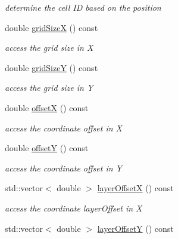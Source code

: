 \begin{DoxyCompactItemize}
\begin{DoxyCompactList}\small\item\em determine the cell ID based on the position \item\end{DoxyCompactList}\item 
double \hyperlink{class_d_d4hep_1_1_d_d_segmentation_1_1_tiled_layer_grid_x_y_a87648f3136523b1d32b0c3a02e85fa28}{gridSizeX} () const 
\begin{DoxyCompactList}\small\item\em access the grid size in X \item\end{DoxyCompactList}\item 
double \hyperlink{class_d_d4hep_1_1_d_d_segmentation_1_1_tiled_layer_grid_x_y_a1e3d5ba29ff7da392441b974bc6c2c44}{gridSizeY} () const 
\begin{DoxyCompactList}\small\item\em access the grid size in Y \item\end{DoxyCompactList}\item 
double \hyperlink{class_d_d4hep_1_1_d_d_segmentation_1_1_tiled_layer_grid_x_y_a9e892950c0d0f6556a8a91b79ea72ee5}{offsetX} () const 
\begin{DoxyCompactList}\small\item\em access the coordinate offset in X \item\end{DoxyCompactList}\item 
double \hyperlink{class_d_d4hep_1_1_d_d_segmentation_1_1_tiled_layer_grid_x_y_a9aebdc0d2b7e2ce60a075d733eaf6188}{offsetY} () const 
\begin{DoxyCompactList}\small\item\em access the coordinate offset in Y \item\end{DoxyCompactList}\item 
std::vector$<$ double $>$ \hyperlink{class_d_d4hep_1_1_d_d_segmentation_1_1_tiled_layer_grid_x_y_a6f4a84bfe3765e5c55b53b31996e2758}{layerOffsetX} () const 
\begin{DoxyCompactList}\small\item\em access the coordinate layerOffset in X \item\end{DoxyCompactList}\item 
std::vector$<$ double $>$ \hyperlink{class_d_d4hep_1_1_d_d_segmentation_1_1_tiled_layer_grid_x_y_a805628a8e85ce9859fb86c64dfa45640}{layerOffsetY} () const 

\end{DoxyCompactItemize}
